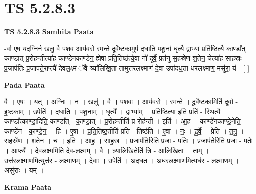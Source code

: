 \documentclass[17pt]{extarticle}
\begin{document}
\section{ TS 5.2.8.3 }

\textbf{TS 5.2.8.3 } \newline
\textbf{Samhita Paata} \newline

-र्वा ए॒ष यद॒ग्निर्न खलु॒ वै प॒शव॒ आय॑वसे रमन्ते दूर्वेष्ट॒कामुप॑ दधाति पशू॒नां धृत्यै॒ द्वाभ्यां॒ प्रति॑ष्ठित्यै॒ काण्डा᳚त् काण्डात् प्र॒रोह॒न्तीत्या॑ह॒ काण्डे॑नकाण्डेन॒ ह्ये॑षा प्र॑ति॒तिष्ठ॑त्ये॒वा नो॑ दूर्वे॒ प्रत॑नु स॒हस्रे॑ण श॒तेन॒ चेत्या॑ह साह॒स्रः प्र॒जाप॑तिः प्र॒जाप॑ते॒राप्त्यै॑ देवल॒क्ष्मं ॅवै त्र्या॑लिखि॒ता तामुत्त॑रलक्ष्माणं दे॒वा उपा॑दध॒ता-ध॑रलक्ष्माण॒-मसु॑रा॒ यं - [  ] \newline

\textbf{Pada Paata} \newline

वै । ए॒षः । यत् । अ॒ग्निः । न । खलु॑ । वै । प॒शवः॑ । आय॑वसे । र॒म॒न्ते॒ । दू॒र्वे॒ष्ट॒कामिति॑ दूर्वा - इ॒ष्ट॒काम् । उपेति॑ । द॒धा॒ति॒ । प॒शू॒नाम् । धृत्यै᳚ । द्वाभ्या᳚म् । प्रति॑ष्ठित्या॒ इति॒ प्रति॑ - स्थि॒त्यै॒ । काण्डा᳚त्काण्डा॒दिति॒ काण्डा᳚त् - का॒ण्डा॒त् । प्र॒रोह॒न्तीति॑ प्र-रोह॑न्ती । इति॑ । आ॒ह॒ । काण्डे॑नकाण्डे॒नेति॒ काण्डे॑न - का॒ण्डे॒न॒ । हि । ए॒षा । प्र॒ति॒तिष्ठ॒तीति॑ प्रति - तिष्ठ॑ति । ए॒वा । नः॒ । दू॒र्वे॒ । प्रेति॑ । त॒नु॒ । स॒हस्रे॑ण । श॒तेन॑ । च॒ । इति॑ । आ॒ह॒ । सा॒ह॒स्रः । प्र॒जाप॑ति॒रिति॑ प्र॒जा - प॒तिः॒ । प्र॒जाप॑ते॒रिति॑ प्र॒जा - प॒तेः॒ । आप्त्यै᳚ । दे॒व॒ल॒क्ष्ममिति॑ देव-ल॒क्ष्मम् । वै । त्र्या॒लि॒खि॒तेति॑ त्रि - आ॒लि॒खि॒ता । ताम् । उत्त॑रलक्ष्माण॒मित्युत्त॑र - ल॒क्ष्मा॒ण॒म् । दे॒वाः । उपेति॑ । अ॒द॒ध॒त॒ । अध॑रलक्ष्माण॒मित्यध॑र - ल॒क्ष्मा॒ण॒म् । असु॑राः । यम् ।  \newline


\textbf{Krama Paata} \newline
\end{document}
